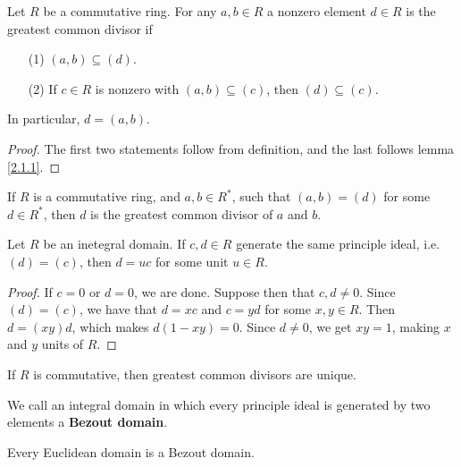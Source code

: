 \begin{lemma}\label{2.1.2}
    Let $R$ be a commutative ring. For any $a,b \in R$ a nonzero element  $d \in
    R$ is the greatest common divisor if
    \begin{enumerate}
        \item[(1)] $(a,b) \subseteq (d)$.

        \item[(2)] If $c \in R$ is nonzero with $(a,b) \subseteq (c)$, then $(d)
            \subseteq (c)$.
    \end{enumerate}
    In particular, $d=(a,b)$.
\end{lemma}
\begin{proof}
    The first two statements follow from definition, and the last follows lemma
    \ref{2.1.1}.
\end{proof}

\begin{lemma}\label{2.1.3}
    If $R$ is a commutative ring, and $a,b \in R^\ast$, such that  $(a,b)=(d)$
    for some $d \in R^\ast$, then $d$ is the greatest common divisor of $a$ and
     $b$.
\end{lemma}

\begin{lemma}\label{}
    Let $R$ be an inetegral domain. If $c,d \in R$ generate the same principle
    ideal, i.e. $(d)=(c)$, then $d=uc$ for some unit  $u \in R$.
\end{lemma}
\begin{proof}
    If $c=0$ or  $d=0$, we are done. Suppose then that  $c,d \neq 0$. Since
    $(d)=(c)$, we have that $d=xc$ and $c=yd$ for some  $x,y \in R$. Then
    $d=(xy)d$, which makes $d(1-xy)=0$. Since $d \neq 0$, we get $xy=1$, making
     $x$ and $y$ units of $R$.
\end{proof}
\begin{corollary}
    If $R$ is commutative, then greatest common divisors are unique.
\end{corollary}

\begin{definition}
    We call an integral domain in which every principle ideal is generated by
    two elements a \textbf{Bezout domain}.
\end{definition}

\begin{lemma}\label{2.1.5}
    Every Euclidean domain is a Bezout domain.
\end{lemma}

